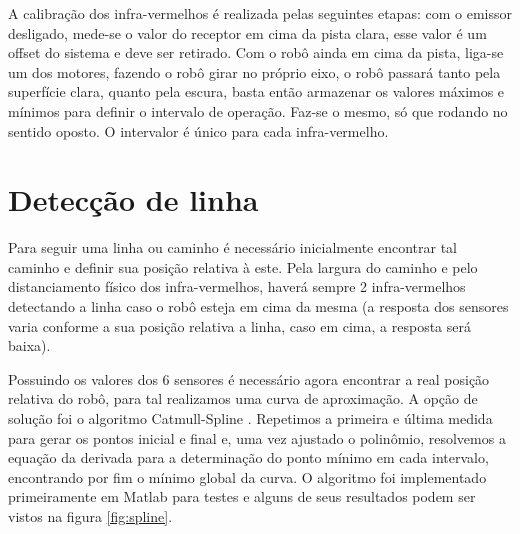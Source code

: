\documentclass{article}
\begin{document}
A calibração dos infra-vermelhos é realizada pelas seguintes etapas: com o emissor desligado, mede-se o valor do receptor em cima da pista clara, esse valor é um offset do sistema e deve ser retirado. Com o robô ainda em cima da pista, liga-se um dos motores, fazendo o robô girar no próprio eixo, o robô passará tanto pela superfície clara, quanto pela escura, basta então armazenar os valores máximos e mínimos para definir o intervalo de operação. Faz-se o mesmo, só que rodando no sentido oposto. O intervalor é único para cada infra-vermelho.

\section{Detecção de linha}
Para seguir uma linha ou caminho é necessário inicialmente encontrar tal caminho e definir sua posição relativa à este. Pela largura do caminho e pelo distanciamento físico dos infra-vermelhos, haverá sempre 2 infra-vermelhos detectando a linha caso o robô esteja em cima da mesma (a resposta dos sensores varia conforme a sua posição relativa a linha, caso em cima, a resposta será baixa).

Possuindo os valores dos 6 sensores é necessário agora encontrar a real posição relativa do robô, para tal realizamos uma curva de aproximação. A opção de solução foi o algoritmo Catmull-Spline \cite{bb:spline}. Repetimos a primeira e última medida para gerar os pontos inicial e final e, uma vez ajustado o polinômio, resolvemos a equação da derivada para a determinação do ponto mínimo em cada intervalo, encontrando por fim o mínimo global da curva. O algoritmo foi implementado primeiramente em Matlab para testes e alguns de seus resultados podem ser vistos na figura \ref{fig:spline}.
\end{document}
